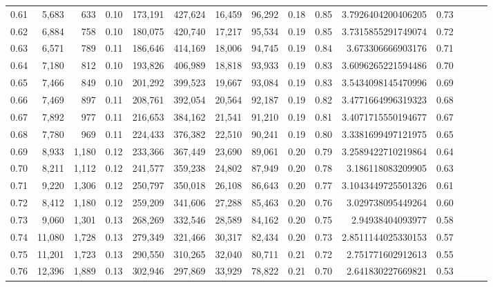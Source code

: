 \begin{tabular}{rrrrrrrrrrrrrrr}
0.61 &   5,683 &    633 &  0.10 &  173,191 &  427,624 &   16,459 &   96,292 &  0.18 &  0.85 &    3.7926404200406205 &      0.73 \\
0.62 &   6,884 &    758 &  0.10 &  180,075 &  420,740 &   17,217 &   95,534 &  0.19 &  0.85 &    3.7315855291749074 &      0.72 \\
0.63 &   6,571 &    789 &  0.11 &  186,646 &  414,169 &   18,006 &   94,745 &  0.19 &  0.84 &     3.673306666903176 &      0.71 \\
0.64 &   7,180 &    812 &  0.10 &  193,826 &  406,989 &   18,818 &   93,933 &  0.19 &  0.83 &    3.6096265221594486 &      0.70 \\
0.65 &   7,466 &    849 &  0.10 &  201,292 &  399,523 &   19,667 &   93,084 &  0.19 &  0.83 &    3.5434098145470996 &      0.69 \\
0.66 &   7,469 &    897 &  0.11 &  208,761 &  392,054 &   20,564 &   92,187 &  0.19 &  0.82 &    3.4771664996319323 &      0.68 \\
0.67 &   7,892 &    977 &  0.11 &  216,653 &  384,162 &   21,541 &   91,210 &  0.19 &  0.81 &    3.4071715550194677 &      0.67 \\
0.68 &   7,780 &    969 &  0.11 &  224,433 &  376,382 &   22,510 &   90,241 &  0.19 &  0.80 &    3.3381699497121975 &      0.65 \\
0.69 &   8,933 &  1,180 &  0.12 &  233,366 &  367,449 &   23,690 &   89,061 &  0.20 &  0.79 &    3.2589422710219864 &      0.64 \\
0.70 &   8,211 &  1,112 &  0.12 &  241,577 &  359,238 &   24,802 &   87,949 &  0.20 &  0.78 &     3.186118083209905 &      0.63 \\
0.71 &   9,220 &  1,306 &  0.12 &  250,797 &  350,018 &   26,108 &   86,643 &  0.20 &  0.77 &    3.1043449725501326 &      0.61 \\
0.72 &   8,412 &  1,180 &  0.12 &  259,209 &  341,606 &   27,288 &   85,463 &  0.20 &  0.76 &     3.029738095449264 &      0.60 \\
0.73 &   9,060 &  1,301 &  0.13 &  268,269 &  332,546 &   28,589 &   84,162 &  0.20 &  0.75 &      2.94938404093977 &      0.58 \\
0.74 &  11,080 &  1,728 &  0.13 &  279,349 &  321,466 &   30,317 &   82,434 &  0.20 &  0.73 &    2.8511144025330153 &      0.57 \\
0.75 &  11,201 &  1,723 &  0.13 &  290,550 &  310,265 &   32,040 &   80,711 &  0.21 &  0.72 &     2.751771602912613 &      0.55 \\
0.76 &  12,396 &  1,889 &  0.13 &  302,946 &  297,869 &   33,929 &   78,822 &  0.21 &  0.70 &     2.641830227669821 &      0.53 \\

\end{tabular}
